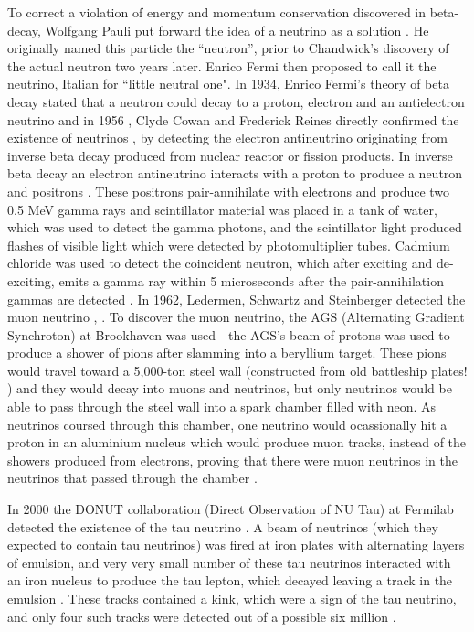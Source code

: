 To correct a violation of energy and momentum conservation discovered in beta-decay, Wolfgang Pauli put forward the idea of a neutrino as a solution \cite{brown_idea_1978}.  He originally named this particle the ``neutron'', prior to Chandwick's discovery of the actual neutron two years later.  Enrico Fermi then proposed to call it the neutrino, Italian for ``little neutral one". In 1934, Enrico Fermi's theory of beta decay stated that a neutron could decay to a proton, electron and an antielectron neutrino \cite{bethe1934neutrino} and in 1956 \cite{luca_electroweak}, Clyde Cowan and Frederick Reines directly confirmed the existence of neutrinos \cite{cowan_reines}, by detecting the electron antineutrino originating from inverse beta decay produced from nuclear reactor or fission products. In inverse beta decay an electron antineutrino interacts with a proton to produce a neutron and positrons \cite{vogel1999angular}.
\newline
These positrons pair-annihilate with electrons and produce two 0.5 MeV gamma rays and scintillator material was placed in a tank of water, which was used to detect the gamma photons, and the scintillator light produced flashes of visible light which were detected by photomultiplier tubes. Cadmium chloride was used to detect the coincident neutron, which after exciting and de-exciting, emits a gamma ray within 5 microseconds after the pair-annihilation gammas are detected \cite{reines1956neutrino}. In 1962, Ledermen, Schwartz and Steinberger detected the muon neutrino \cite{feinberg1963physics}, \cite{lederman_schwartz}. To discover the muon neutrino, the AGS (Alternating Gradient Synchroton) at Brookhaven \cite{courant1958theory} was used - the AGS's beam of protons was used to produce a shower of pions after slamming into a beryllium target. These pions would travel toward a 5,000-ton steel wall (constructed from old battleship plates! \cite{ricoux2010search}) and they would decay into muons and neutrinos, but only neutrinos would be able to pass through the steel wall into a spark chamber filled with neon. As neutrinos coursed through this chamber, one neutrino would ocassionally hit a proton in an aluminium nucleus which would produce muon tracks, instead of the showers produced from electrons, proving that there were muon neutrinos in the neutrinos that passed through the chamber \cite{lindley2015landmarks}. 
\newline

In 2000 the DONUT collaboration (Direct Observation of NU Tau) at Fermilab detected the existence of the tau neutrino \cite{kodama2001observation}. A beam of neutrinos (which they expected to contain tau neutrinos) was fired at iron plates with alternating layers of emulsion, and very very small number of these tau neutrinos interacted with an iron nucleus to produce the tau lepton, which decayed leaving a track in the emulsion \cite{kodama2004identification}. These tracks contained a kink, which were a sign of the tau neutrino, and only four such tracks were detected out of a possible six million \cite{kodama1993muon}.

